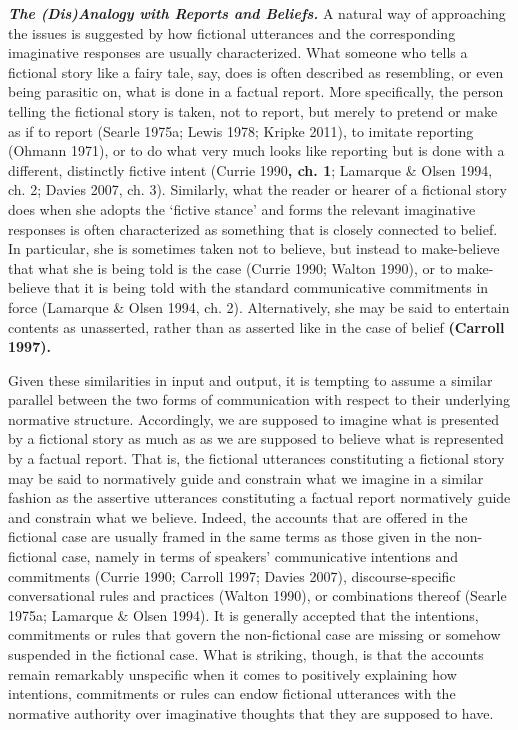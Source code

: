 \vspace{.2cm}
\noindent\textbf{\emph{The (Dis)Analogy with Reports and Beliefs.}} A natural way of approaching the issues is suggested by how fictional utterances and the corresponding imaginative responses are usually characterized. What someone who tells a fictional story like a fairy tale, say, does is often described as resembling, or even being parasitic on, what is done in a factual report. More specifically, the person telling the fictional story is taken, not to report, but merely to pretend or make as if to report (Searle 1975a; Lewis 1978; Kripke 2011), to imitate reporting (Ohmann 1971), or to do what very much looks like reporting but is done with a different, distinctly fictive intent (Currie 1990\textbf{, ch. 1}; Lamarque \& Olsen 1994, ch. 2; Davies 2007, ch. 3). Similarly, what the reader or hearer of a fictional story does when she adopts the `fictive stance' and forms the relevant imaginative responses is often characterized as something that is closely connected to belief. In particular, she is sometimes taken not to believe, but instead to make-believe that what she is being told is the case (Currie 1990; Walton 1990), or to make-believe that it is being told with the standard communicative commitments in force (Lamarque \& Olsen 1994, ch. 2). Alternatively, she may be said to entertain contents as unasserted, rather than as asserted like in the case of belief \textbf{(Carroll 1997).}

Given these similarities in input and output, it is tempting to assume a similar parallel between the two forms of communication with respect to their underlying normative structure. Accordingly, we are supposed to imagine what is presented by a fictional story as much as as we are supposed to believe what is represented by a factual report. That is, the fictional utterances constituting a fictional story may be said to normatively guide and constrain what we imagine in a similar fashion as the assertive utterances constituting a factual report normatively guide and constrain what we believe. Indeed, the accounts that are offered in the fictional case are usually framed in the same terms as those given in the non-fictional case, namely in terms of speakers' communicative intentions and commitments (Currie 1990; Carroll 1997; Davies 2007), discourse-specific conversational rules and practices (Walton 1990), or combinations thereof (Searle 1975a; Lamarque \& Olsen 1994). It is generally accepted that the intentions, commitments or rules that govern the non-fictional case are missing or somehow suspended in the fictional case. What is striking, though, is that the accounts remain remarkably unspecific when it comes to positively explaining how intentions, commitments or rules can endow fictional utterances with the normative authority over imaginative thoughts that they are supposed to have.

